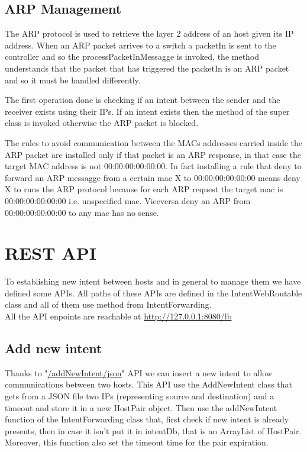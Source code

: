 \documentclass[a4paper]{report}
\begin{document}
\subsection{ARP Management}
\noindent The ARP protocol is used to retrieve the layer 2 address of an host given its IP address. When an ARP packet arrives to a switch a packetIn is sent to the controller and so the processPacketInMessagge is invoked, the method understands that the packet that has triggered the packetIn is an ARP packet and so it must be handled differently.


\noindent The first operation done is checking if an intent between the sender and the receiver exists using their IPs. If an intent exists then the method of the super class is invoked otherwise the ARP packet is blocked.


\noindent The rules to avoid communication between the MACs addresses carried inside the ARP packet are installed only if that packet is an ARP response, in that case the target MAC address is not 00:00:00:00:00:00. In fact installing a rule that deny to forward an ARP messagge from a certain mac X to 00:00:00:00:00:00 means deny X to runs the ARP protocol because for each ARP request the target mac is 00:00:00:00:00:00 i.e. unspecified mac. Viceversa deny an ARP from 00:00:00:00:00:00 to any mac has no sense.	
	
	\section{REST API}
	\noindent To establishing new intent between hosts and in general to manage them we have defined some APIs.
	 All paths of these APIs are defined in the IntentWebRoutable class and all of them use method from IntentForwarding.\\
	 All the API enpoints are reachable at \url{http://127.0.0.1:8080/lb}
	
	\subsection{Add new intent}
	\noindent Thanks to "\url{/addNewIntent/json}" API we can insert a new intent to allow communications between two hosts. This API use the AddNewIntent class that gets from a JSON file two IPs (representing source and destination) and a timeout and store it in a new HostPair object. Then use the addNewIntent function of the IntentForwarding class that, first check if new intent is already presents, then in case it isn’t put it in intentDb, that is an ArrayList of HostPair. Moreover, this function also set the timeout time for the pair expiration.
	
\end{document}
